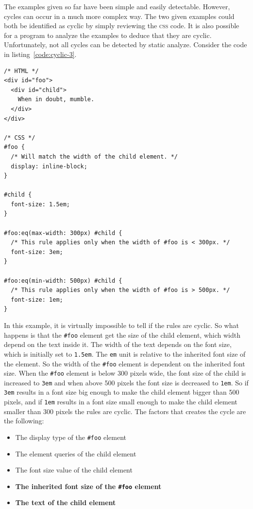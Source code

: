 \documentclass[a4paper,11pt]{kth-mag}
\newcommand{\code}[1]{\texttt{#1}}
\begin{document}
          The examples given so far have been simple and easily detectable.
          However, cycles can occur in a much more complex way.
          The two given examples could both be identified as cyclic by simply reviewing the \textsc{css} code.
          It is also possible for a program to analyze the examples to deduce that they are cyclic.
          Unfortunately, not all cycles can be detected by static analyze.
          Consider the code in listing~\ref{code:cyclic-3}.
          \begin{lstlisting}[caption={Example of indirect cyclic rules.}, captionpos=b, label={code:cyclic-3}]
/* HTML */
<div id="foo">
  <div id="child">
    When in doubt, mumble.
  </div>
</div>

/* CSS */
#foo {
  /* Will match the width of the child element. */
  display: inline-block;
}

#child {
  font-size: 1.5em;
}

#foo:eq(max-width: 300px) #child {
  /* This rule applies only when the width of #foo is < 300px. */
  font-size: 3em;
}

#foo:eq(min-width: 500px) #child { 
  /* This rule applies only when the width of #foo is > 500px. */
  font-size: 1em;
}
          \end{lstlisting}
          In this example, it is virtually impossible to tell if the rules are cyclic.
          So what happens is that the \code{\#foo} element get the size of the child element, which width depend on the text inside it.
          The width of the text depends on the font size, which is initially set to \code{1.5em}.
          The \code{em} unit is relative to the inherited font size of the element.
          So the width of the \code{\#foo} element is dependent on the inherited font size.
          When the \code{\#foo} element is below 300 pixels wide, the font size of the child is increased to \code{3em} and when above 500 pixels the font size is decreased to \code{1em}.
          So if \code{3em} results in a font size big enough to make the child element bigger than 500 pixels, and if \code{1em} results in a font size small enough to make the child element smaller than 300 pixels the rules are cyclic.
          The factors that creates the cycle are the following:
          \begin{itemize}
            \item The display type of the \code{\#foo} element
            \item The element queries of the child element
            \item The font size value of the child element
            \item \textbf{The inherited font size of the \code{\#foo} element}
            \item \textbf{The text of the child element}
          \end{itemize}
\end{document}
